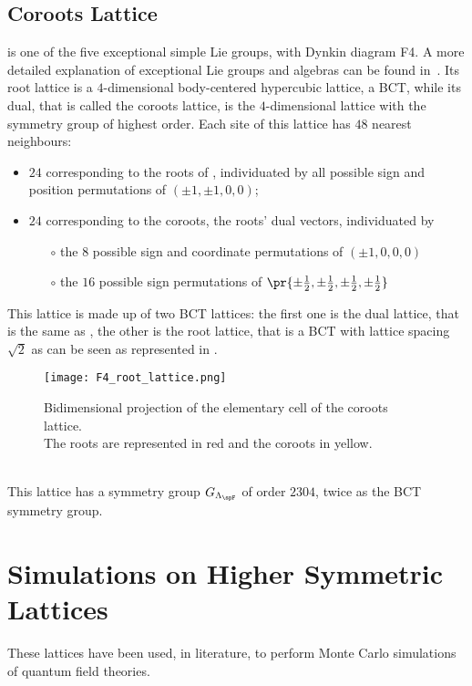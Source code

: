 \subsection{\spFtext Coroots Lattice}
\spFtext is one of the five exceptional simple Lie groups, with Dynkin diagram \dynkin F4.
A more detailed explanation of exceptional Lie groups and algebras can be found in~\cite{adams1996lectures}.
Its root lattice is a $4$-dimensional body-centered hypercubic lattice, a BCT, while its dual, that is called the \spFtext coroots lattice, is the $4$-dimensional lattice with the symmetry group of highest order.
Each site of this lattice has $48$ nearest neighbours:
\begin{itemize}
    \item $24$ corresponding to the roots of \spFtext, individuated by all possible sign and position permutations of $(\pm1,\pm1,0,0)$;\
    \item $24$ corresponding to the coroots, the roots' dual vectors, individuated by\
    \begin{itemize}
        \item[$\circ$] the $8$ possible sign and coordinate permutations of $(\pm1,0,0,0)$\
        \item[$\circ$] the $16$ possible sign permutations of $\pr{\pm\frac12,\pm\frac12,\pm\frac12,\pm\frac12}$\
    \end{itemize}
\end{itemize}
This lattice is made up of two BCT lattices: the first one is the dual lattice, that is the same as , the other is the root lattice, that is a BCT with lattice spacing $\sqrt2$ as can be seen as represented in .
\begin{figure}[!htbp]
    \centering
    \texttt{[image: F4\_root\_lattice.png]}
    \caption{Bidimensional projection of the elementary cell of the \spFtext coroots lattice.\\
             The roots are represented in red and the coroots in yellow.}
    \label{3:F4cell}
\end{figure}\\
This lattice has a symmetry group $G_{\Lambda_{\spF}}$ of order $2304$, twice as the BCT symmetry group.

\section{Simulations on Higher Symmetric Lattices}
These lattices have been used, in literature, to perform Monte Carlo simulations of quantum field theories.

